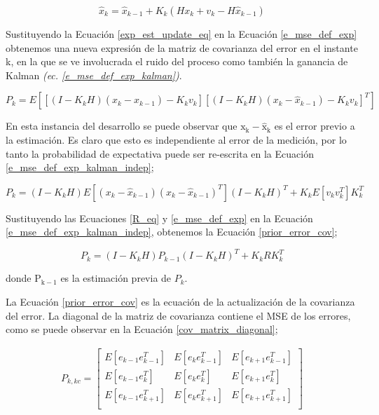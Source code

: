 \documentclass[10pt,a4paper]{article}
\begin{document}
\begin{equation}
    \hat{x}_k = \hat{x}_{k-1} + K_k\left(Hx_k + v_k - H\hat{x}_{k-1}\right)
    \label{exp_est_update_eq}
\end{equation}

Sustituyendo la Ecuaci\'on \ref{exp_est_update_eq} en la Ecuaci\'on
\ref{e_mse_def_exp} obtenemos una nueva expresi\'on de la matriz de covarianza
del error en el instante k, en la que se ve involucrada el ruido del proceso
como tambi\'en la ganancia de Kalman \emph{(ec. \ref{e_mse_def_exp_kalman})}.

\begin{equation}
    P_k = E\left[\left[\left(I - K_kH\right)\left(x_k - \hat{x}_{k-1}\right) -
    K_kv_k\right]\left[\left(I - K_kH\right)\left(x_k -\hat{x}_{k-1}\right) -
    K_kv_k\right]^T\right] \label{e_mse_def_exp_kalman}
\end{equation}

En esta instancia del desarrollo se puede observar que $\mathrm{x_k - \hat{x}_k}$
es el error previo a la estimaci\'on. Es claro que esto es independiente al
error de la medici\'on, por lo tanto la probabilidad de expectativa puede ser
re-escrita en la Ecuaci\'on \ref{e_mse_def_exp_kalman_indep};

\begin{equation}
    P_k = \left(I - K_kH\right)E\left[\left(x_k - \hat{x}_{k-1}\right)\left(x_k
        - \hat{x}_{k-1}\right)^T\right]\left(I - K_kH\right)^T +
        K_kE\left[v_kv_k^T\right]K_k^T\label{e_mse_def_exp_kalman_indep}
\end{equation}

Sustituyendo las Ecuaciones \ref{R_eq} y \ref{e_mse_def_exp} en la Ecuaci\'on
\ref{e_mse_def_exp_kalman_indep}, obtenemos la Ecuaci\'on \ref{prior_error_cov};

\begin{equation}
    P_k = \left(I - K_kH\right)P_{k-1}\left(I-K_kH\right)^T + K_kRK_k^T \label{prior_error_cov}
\end{equation}

donde $\mathrm{P_{k-1}}$ es la estimaci\'on previa de $P_k$.

La Ecuaci\'on \ref{prior_error_cov} es la ecuaci\'on de la actualizaci\'on de la
covarianza del error. La diagonal de la matriz de covarianza contiene el
\acrshort{MSE} de los errores, como se puede observar en la Ecuaci\'on
\ref{cov_matrix_diagonal};

\begin{gather}
    P_{k,kc}  = \begin{bmatrix}
E\left[e_{k-1}e^T_{k-1}\right]  & E\left[e_ke^T_{k-1}\right] & E\left[e_{k+1}e^T_{k-1}\right] \\
E\left[e_{k-1}e^T_k\right]  & E\left[e_ke^T_k\right] & E\left[e_{k+1}e^T_k\right] \\
E\left[e_{k-1}e^T_{k+1}\right]  & E\left[e_ke^T_{k+1}\right] & E\left[e_{k+1}e^T_{k+1}\right] \\
                \end{bmatrix}\label{cov_matrix_diagonal}
\end{gather}
\end{document}
